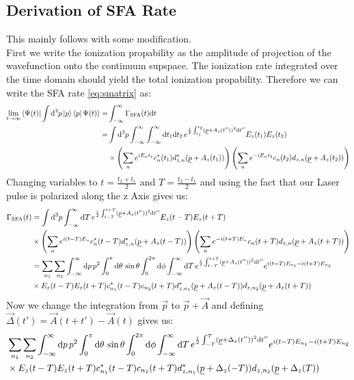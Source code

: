 \subsection{Derivation of SFA Rate}
This mainly follows \cite{Theory_NPS} with some modification.\\
First we write the ionization propability as the amplitude of projection of the wavefunction onto the continuum supspace.
The ionization rate integrated over the time domain should yield the total ionization propability.
Therefore we can write the SFA rate \eqref{eq:smatrix} as:
\begin{align*}
    \lim_{t\to\infty}\braket{\Psi(t)|\int \dd^3 p \ket{p}\bra{p}\Psi(t)} = &\int_{-\infty}^{\infty} \Gamma_{\mathrm{SFA}}(t) \dd t \\ %
    = &\int \dd^3 p \int_{-\infty}^{\infty} \int_{-\infty}^{\infty} \dd t_1  \dd t_2 \, e^{\frac{i}{2}\int_{t_1}^{t_2}(\uvec{p}+A_z(t''))^2\dd t''} E_z(t_1)E_z(t_2)\\
    &\times\left(\sum_{n}e^{iE_nt_1}c_n^*(t_1)d_{z,n}^*(\uvec{p}+A_z(t_1))\right)\left(\sum_{n}e^{-iE_nt_2}c_n(t_2)d_{z,n}(\uvec{p}+A_z(t_2))\right)
\end{align*}
Changing variables to $t=\frac{t_2+t_1}{2}$ and $T=\frac{t_2-t_1}{2}$ and using the fact that our Laser pulse is polarized along the z Axis gives us:
\begin{align*}
    \Gamma_{\mathrm{SFA}}(t) &= \int \mathrm{d}^3 p \int_{-\infty}^{\infty} \mathrm{d} T \, e^{\frac{i}{2}\int_{t-T}^{t+T}(\underline{p}+A_z(t''))^2\mathrm{d} t''} E_z(t-T) E_z(t+T)\\
    &\times\left(\sum_{n}e^{i(t-T)E_n}c_n^*(t-T)d_{z,n}^*(\underline{p}+A_z(t-T))\right)\left(\sum_{n}e^{-i(t+T)E_n}c_n(t+T)d_{z,n}(\underline{p}+A_z(t+T))\right)\\
    &= \sum_{n_1}\sum_{n_2} \int_{-\infty}^{\infty} \mathrm{d} p\,p^2\int_0^{\pi} \mathrm{d}\theta\,\sin\theta \int_0^{2\pi}\mathrm{d} \phi\int_{-\infty}^{\infty} \mathrm{d} T \, e^{\frac{i}{2}\int_{t-T}^{t+T}(\underline{p}+A_z(t''))^2\mathrm{d} t''} e^{i(t-T)E_{n_1}-i(t+T)E_{n_2}}\\
    &\times E_z(t-T) E_z(t+T)c_{n_1}^*(t-T)c_{n_2}(t+T) d_{z,n_1}^*(\underline{p}+A_z(t-T))d_{z,n_2}(\underline{p}+A_z(t+T))
\end{align*}
Now we change the integration from $\vec{p}$ to $\vec{p}+\vec{A}$ and defining $\vec{\Delta}(t') = \vec{A}(t+t') - \vec{A}(t)$ gives us:
\begin{align*}
    &\sum_{n_1}\sum_{n_2} \int_{-\infty}^{\infty} \mathrm{d} p\,p^2\int_0^{\pi} \mathrm{d}\theta\,\sin\theta \int_0^{2\pi}\mathrm{d} \phi\int_{-\infty}^{\infty} \mathrm{d} T \, e^{\frac{i}{2}\int_{-T}^{T}(\underline{p}+\Delta_z(t''))^2\mathrm{d} t''} e^{i(t-T)E_{n_1}-i(t+T)E_{n_2}}\\
    &\times E_z(t-T) E_z(t+T)c_{n_1}^*(t-T)c_{n_2}(t+T) d_{z,n_1}^*(\underline{p}+\Delta_z(-T))d_{z,n_2}(\underline{p}+\Delta_z(T))
\end{align*}

